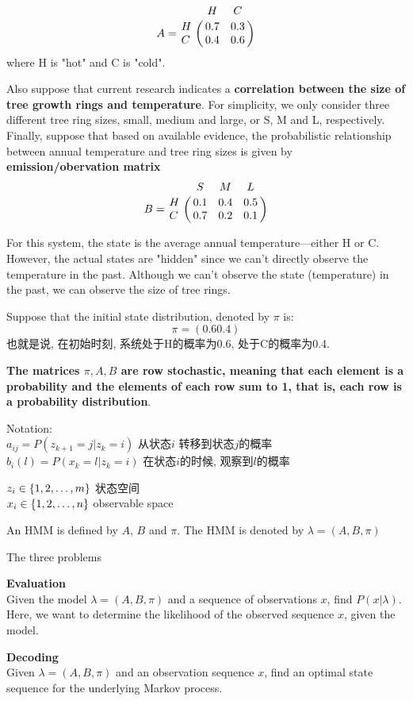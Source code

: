\documentclass{article}
\begin{document}
$$
A = 
\bordermatrix{
~ & H & C \cr
H & 0.7 & 0.3 \cr
C & 0.4 & 0.6 \cr}
$$
where H is "hot" and C is "cold".

Also suppose that current research indicates a \textbf{correlation between the size of tree growth rings and temperature}. 
For simplicity, we only consider three different tree ring sizes, small, medium and large, or S, M and L, respectively. 
Finally, suppose that based on available evidence, the probabilistic relationship between annual temperature and tree ring sizes is given by
\textbf{emission/obervation matrix}
$$
B = 
\bordermatrix{
~ & S & M & L\cr
H & 0.1 & 0.4 & 0.5 \cr
C & 0.7 & 0.2 & 0.1\cr}
$$

For this system, the state is the average annual temperature—either H or C.\\
However, the actual states are "hidden" since we can't directly observe the temperature in the past.
Although we can't observe the state (temperature) in the past, we can observe the size of tree rings.

Suppose that the initial state distribution, denoted by $\pi$ is:
$$\pi = (0.6 0.4)$$
也就是说, 在初始时刻, 系统处于H的概率为0.6, 处于C的概率为0.4.

\textbf{The matrices $\pi,A,B$ are row stochastic, meaning that each element is a probability and the elements of each row sum to 1, 
that is, each row is a probability distribution}.

Notation:\\
$a_{ij} = P(z_{k+1} = j | z_k = i)$ 从状态$i$ 转移到状态$j$的概率\\
$b_i(l) = P(x_k = l | z_k = i)$ 在状态$i$的时候, 观察到$l$的概率

\noindent
$z_i \in \{1,2,\ldots, m\}$ 状态空间\\
$x_i \in \{1,2,\ldots, n\}$ observable space

An HMM is defined by $A$, $B$ and $\pi$. The HMM is denoted by $\lambda = (A,B,\pi)$

The three problems
\begin{problem}
\textbf{Evaluation}\\
Given the model $\lambda = (A,B,\pi)$ and a sequence of observations $x$, find $P(x|\lambda)$. Here, we
want to determine the likelihood of the observed sequence $x$, given the model.
\end{problem}

\begin{problem}
\textbf{Decoding}\\
Given $\lambda = (A,B,\pi)$ and an observation sequence $x$, find an optimal state sequence for the underlying Markov process.
\end{problem}
\end{document}
